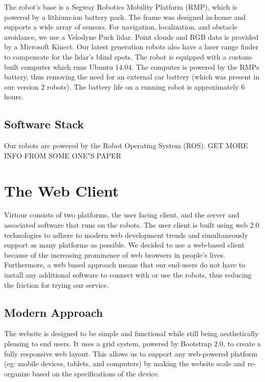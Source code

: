 \documentclass{sig-alternate-05-2015}
\begin{document}
The robot's base is a Segway Robotics Mobility Platform (RMP), which is
powered by a lithium-ion battery pack. The frame was designed in-house and
supports a wide array of sensors. For navigation, localization, and obstacle
avoidance, we use a Velodyne Puck lidar. Point clouds and RGB data is provided
by a Microsoft Kinect. Our latest generation robots also have a laser range
finder to compensate for the lidar's blind spots. The robot is equipped with a
custom-built computer which runs Ubuntu 14.04. The computer is powered by the
RMPs battery, thus removing the need for an external car battery (which was
present in our version 2 robots).  The battery life on a running robot is
approximately 6 hours.

\subsection{Software Stack}

Our robots are powered by the Robot Operating System (ROS). {GET MORE
INFO FROM SOME ONE"S PAPER}

\section{The Web Client}

Virtour consists of two platforms, the user facing client, and the server
and associated software that runs on the robots. The user client is built using
web 2.0 technologies to adhere to modern web development trends and
simultaneously support as many platforms as possible. We decided to use a
web-based client because of the increasing prominence of web browsers in
people's lives. Furthermore, a web based approach means that our end-users do
not have to install any additional software to connect with or use the robots,
thus reducing the friction for trying our service.

\subsection{Modern Approach}

The website is designed to be simple and functional while still being
aesthetically pleasing to end users. It uses a grid system, powered by
Bootstrap 2.0, to create a fully responsive web layout. This allows us to
support any web-powered platform (eg: mobile devices, tablets, and computers)
by making the website scale and re-organize based on the specifications of the
device.
\end{document}
